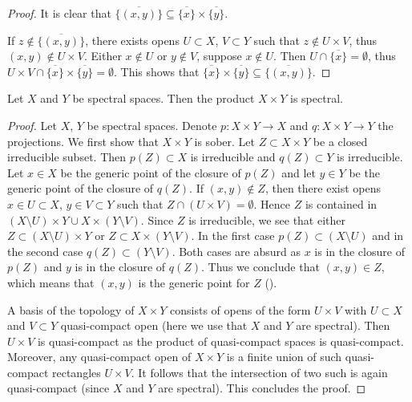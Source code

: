\begin{proof}
  It is clear that \(\overline{\{(x, y)\}} \subseteq \overline{\{x\}} \times \overline{\{y\}}\).

  If \(z \notin \overline{\{(x, y)\}}\), there exists opens \(U \subset X\), \(V \subset Y\) such that \(z \notin U \times V\), thus \((x, y) \notin U \times V\). Either \(x \notin U\) or \(y \notin V\), suppose \(x \notin U\). Then \(U \cap \overline{\{x\}} = \emptyset\), thus \(U \times V \cap \overline{\{x\}} \times \overline{\{y\}}  = \emptyset\). This shows that \(\overline{\{x\}} \times \overline{\{y\}} \subseteq \overline{\{(x, y)\}}\).
\end{proof}

\begin{lemma}
  \label{thm:spectral-product}
  Let $X$ and $Y$ be spectral spaces. Then the product $X \times Y$ is spectral.
\end{lemma}

\begin{proof}
  Let $X$, $Y$ be spectral spaces. Denote $p : X \times Y \to X$ and $q : X \times Y \to Y$ the projections. We first show that \(X \times Y\) is sober. Let $Z \subset X \times Y$ be a closed irreducible subset. Then $p(Z) \subset X$ is irreducible and $q(Z) \subset Y$ is irreducible. Let $x \in X$ be the generic point of the closure of $p(Z)$ and let $y \in Y$ be the generic point of the closure of $q(Z)$. If $(x, y) \notin Z$, then there exist opens $x \in U \subset X$, $y \in V \subset Y$ such that $Z \cap (U \times V) = \emptyset$. Hence $Z$ is contained in $(X \setminus U) \times Y \cup X \times (Y \setminus V)$. Since $Z$ is irreducible, we see that either $Z \subset (X \setminus U) \times Y$ or $Z \subset X \times (Y \setminus V)$. In the first case $p(Z) \subset (X \setminus U)$ and in the second case $q(Z) \subset (Y \setminus V)$. Both cases are absurd as $x$ is in the closure of $p(Z)$ and $y$ is in the closure of $q(Z)$. Thus we conclude that $(x, y) \in Z$, which means that $(x, y)$ is the generic point for $Z$ ().

  A basis of the topology of $X \times Y$ consists of opens of the form $U \times V$ with $U \subset X$ and $V \subset Y$ quasi-compact open (here we use that $X$ and $Y$ are spectral). Then $U \times V$ is quasi-compact as the product of quasi-compact spaces is quasi-compact. Moreover, any quasi-compact open of $X \times Y$ is a finite union of such quasi-compact rectangles $U \times V$. It follows that the intersection of two such is again quasi-compact (since $X$ and $Y$ are spectral). This concludes the proof.
\end{proof}

